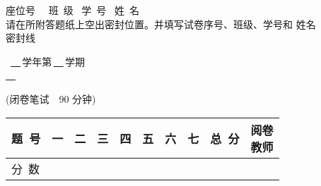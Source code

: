 \fancyhf{}
\sbox{\zdx}
{\parbox{27cm}{\centering
	座位号~\underline{\makebox[34mm][c]{}}~ 班~级\underline{\makebox[34mm][c]{}}~ 学~号\underline{\makebox[44mm][c]{}}~ 姓~名\underline{\makebox[34mm][c]{}} ~\\
	\vspace{3mm}
请在所附答题纸上空出密封位置。并填写试卷序号、班级、学号和 姓名\\
\vspace{1mm}
\dotfill{} 密\dotfill{}封\dotfill{}线\dotfill{} \\
	}}
\reversemarginpar
	
\begin{spacing}{1.25}
	\begin{center}
\begin{LARGE}
\school~\underline{~\xuenian~}\,学年第\,\underline{~\xueqi~}\,学期\\
\underline{~\kecheng~}\,\\
\end{LARGE}
(闭卷笔试\ \ 90 分钟)\\
	\vspace{0.5cm}
\begin{tabular}{|m{}|*{8}{m{}|}p{}|}
	\hline
\centering  题~号 & \centering 一 & \centering 二 & \centering 三 & \centering 四& \centering 五 & \centering 六 & \centering 七 %
& \centering 总~分 & \makecell{阅卷\\教师} \rule{0pt}{3mm} \\
	\hline
	\centering 分~数 &  &  &  &  &  &  &  &  &  %
	\rule{0pt}{8mm} \\\hline
\end{tabular}
\end{center}
\end{spacing}
\vspace{-0.5cm}
\setlength{\marginparsep}{1.7cm}
\putzdx %
\vspace{1cm}
